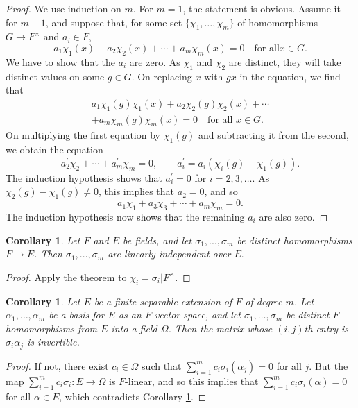 \documentclass[a4paper,11pt,final,openany]{memoir}
\newtheorem{corollary}[X]{Corollary}
\theoremstyle{nonumberplain}
\newtheorem{proof}{Proof.}
\begin{document}
\begin{proof}
We use induction on $m$. For $m=1$, the statement is obvious. Assume it for
$m-1$, and suppose that, for some set $\{\chi_{1},\ldots,\chi_{m}\}$ of
homomorphisms $G\rightarrow F^{\times}$ and $a_{i}\in F$,%
\[
a_{1}\chi_{1}(x)+a_{2}\chi_{2}(x)+\cdots+a_{m}\chi_{m}(x)=0\quad\text{for all
}x\in G.
\]
We have to show that the $a_{i}$ are zero. As $\chi_{1}$ and $\chi_{2}$ are
distinct, they will take distinct values on some $g\in G$. On replacing $x$
with $gx$ in the equation, we find that
\begin{align*}
a_{1}\chi_{1}(g)\chi_{1}(x)+a_{2}\chi_{2}(g)\chi_{2}(x)+\cdots\\
+a_{m}\chi
_{m}(g)\chi_{m}(x)=0\quad\text{for all }x\in G.
\end{align*}
On multiplying the first equation by $\chi_{1}(g)$ and subtracting it from the
second, we obtain the equation
\[
a_{2}^{\prime}\chi_{2}+\cdots+a_{m}^{\prime}\chi_{m}=0,\qquad a_{i}^{\prime
}=a_{i}(\chi_{i}(g)-\chi_{1}(g)).
\]
The induction hypothesis shows that $a_{i}^{\prime}=0$ for $i=2,3,\ldots$. As
$\chi_{2}(g)-\chi_{1}(g)\neq0$, this implies that $a_{2}=0$, and so%
\[
a_{1}\chi_{1}+a_{3}\chi_{3}+\cdots+a_{m}\chi_{m}=0.
\]
The induction hypothesis now shows that the remaining $a_{i}$ are also zero.
\end{proof}

\begin{corollary}
\label{ag14}Let $F$ and $E$ be fields, and let $\sigma_{1},...,\sigma_{m}$ be
distinct homomorphisms $F\rightarrow E$. Then $\sigma_{1},...,\sigma_{m}$ are
linearly independent over $E.$
\end{corollary}

\begin{proof}
Apply the theorem to $\chi_{i}=\sigma_{i}|F^{\times}$.
\end{proof}

\begin{corollary}
\label{ag14m}Let $E$ be a finite separable extension of $F$ of degree $m$. Let
$\alpha_{1},\ldots,\alpha_{m}$ be a basis for $E$ as an $F$-vector space, and
let $\sigma_{1},\ldots,\sigma_{m}$ be distinct $F$-homomorphisms from $E$ into
a field $\Omega$. Then the matrix whose $(i,j)$th-entry is $\sigma_{i}%
\alpha_{j}$ is invertible.
\end{corollary}

\begin{proof}
If not, there exist $c_{i}\in\Omega$ such that $\sum\nolimits_{i=1}^{m}%
c_{i}\sigma_{i}(\alpha_{j})=0$ for all $j$. But the map $\sum\nolimits_{i=1}%
^{m}c_{i}\sigma_{i}\colon E\rightarrow\Omega$ is $F$-linear, and so this
implies that $\sum\nolimits_{i=1}^{m}c_{i}\sigma_{i}(\alpha)=0$ for all
$\alpha\in E$, which contradicts Corollary \ref{ag14}.
\end{proof}
\end{document}

